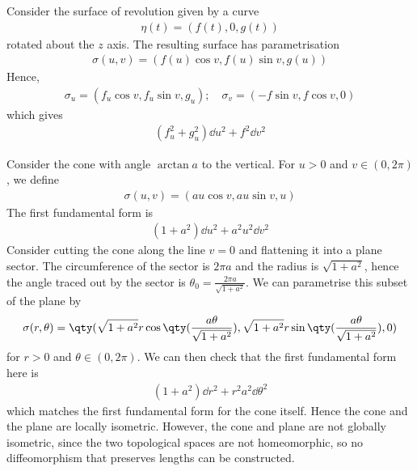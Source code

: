 \begin{example}
	Consider the surface of revolution given by a curve
	\begin{align*}
		\eta(t) = (f(t),0,g(t))
	\end{align*}
	rotated about the $z$ axis.
	The resulting surface has parametrisation
	\begin{align*}
		\sigma(u,v) = (f(u) \cos v, f(u) \sin v, g(u))
	\end{align*}
	Hence,
	\begin{align*}
		\sigma_u = (f_u \cos v, f_u \sin v, g_u);\quad \sigma_v = (-f \sin v, f \cos v, 0)
	\end{align*}
	which gives
	\begin{align*}
		(f_u^2 + g_u^2) \dd{u}^2 + f^2 \dd{v}^2
	\end{align*}
\end{example}
\begin{example}
	Consider the cone with angle $\arctan a$ to the vertical.
	For $u > 0$ and $v \in (0,2\pi)$, we define
	\begin{align*}
		\sigma(u,v) = (au\cos v, au\sin v, u)
	\end{align*}
	The first fundamental form is
	\begin{align*}
		(1+a^2)\dd{u}^2 + a^2 u^2 \dd{v}^2
	\end{align*}
	Consider cutting the cone along the line $v = 0$ and flattening it into a plane sector.
	The circumference of the sector is $2 \pi a$ and the radius is $\sqrt{1+a^2}$, hence the angle traced out by the sector is $\theta_0 = \frac{2 \pi a}{\sqrt{1+a^2}}$.
	We can parametrise this subset of the plane by
	\begin{align*}
		\sigma(r,\theta) = \qty(\sqrt{1+a^2} r\cos\qty(\frac{a\theta}{\sqrt{1+a^2}}), \sqrt{1+a^2} r\sin\qty(\frac{a\theta}{\sqrt{1+a^2}}), 0)
	\end{align*}
	for $r > 0$ and $\theta \in (0,2\pi)$.
	We can then check that the first fundamental form here is
	\begin{align*}
		(1+a^2) \dd{r}^2 + r^2 a^2 \dd{\theta}^2
	\end{align*}
	which matches the first fundamental form for the cone itself.
	Hence the cone and the plane are locally isometric.
	However, the cone and plane are not globally isometric, since the two topological spaces are not homeomorphic, so no diffeomorphism that preserves lengths can be constructed.
\end{example}
